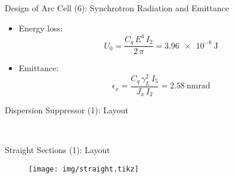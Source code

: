 \documentclass{beamer}
\begin{document}
\begin{frame}[t]{Design of Arc Cell (6): Synchrotron Radiation and Emittance}
\begin{itemize}
\item Energy loss:
\begin{equation}
U_0 = \frac{C_q\,E^4\,I_2}{2\,\pi}=\SI{3.96e-8}{\joule}
\end{equation}
\item Emittance:
\begin{equation}
\epsilon_x = \frac{C_q\,\gamma_L^2\,I_5}{J_x\,I_2}=\SI{2.58}{\nano\meter\radian}
\end{equation}
\end{itemize}
\end{frame}

\begin{frame}[t]{Dispersion Suppressor (1): Layout}
\begin{figure}
  \centering
  \\
\end{figure}
\end{frame}

\begin{frame}[t]{Straight Sections (1): Layout}
\begin{figure}
\centering
\texttt{[image: img/straight.tikz]}
\end{figure}
\end{frame}
\end{document}
